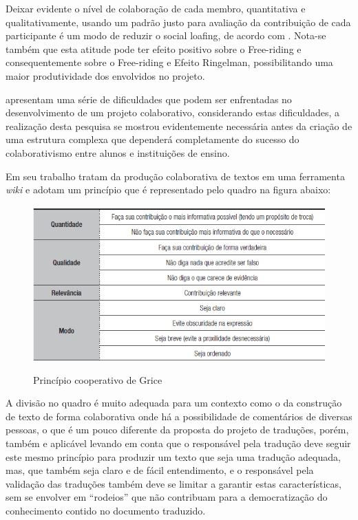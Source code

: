 Deixar evidente o nível de colaboração de cada membro, quantitativa e qualitativamente, usando um padrão justo para avaliação da contribuição de cada participante é um modo de reduzir o social loafing, de acordo com . Nota-se também que esta atitude pode ter efeito positivo sobre o Free-riding e consequentemente sobre o Free-riding e Efeito Ringelman, possibilitando uma maior produtividade dos envolvidos no projeto.

 apresentam uma série de dificuldades que podem ser enfrentadas no desenvolvimento de um projeto colaborativo, considerando estas dificuldades, a realização desta pesquisa se mostrou evidentemente necessária antes da criação de uma estrutura complexa que dependerá completamente do sucesso do colaborativismo entre alunos e instituições de ensino.

Em seu trabalho  tratam da produção colaborativa de textos em uma ferramenta \textit{wiki} e adotam um princípio que é representado pelo quadro na figura abaixo:

\begin{figure}[!htb]
	\centering
	\caption{Princípio cooperativo de Grice}
	\includegraphics[width=1.0\textwidth]{./dados/figuras/distribuicao-grice}
	\label{fig:quadro-grice}
\end{figure}

A divisão no quadro é muito adequada para um contexto como o da construção de texto de forma colaborativa onde há a possibilidade de comentários de diversas pessoas, o que é um pouco diferente da proposta do projeto de traduções, porém, também e aplicável levando em conta que o responsável pela tradução deve seguir este mesmo princípio para produzir um texto que seja uma tradução adequada, mas, que também seja claro e de fácil entendimento, e o responsável pela validação das traduções também deve se limitar a garantir estas características, sem se envolver em “rodeios” que não contribuam para a democratização do conhecimento contido no documento traduzido.

